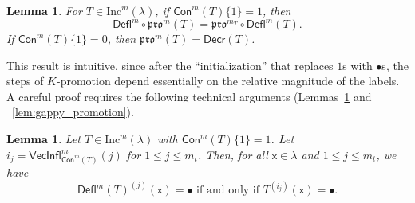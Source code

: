 \documentclass[12pt]{amsart}
\newcommand{\x}{\ensuremath{\mathsf{x}}}
\newtheorem{lemma}[theorem]{Lemma}
\theoremstyle{definition}
\theoremstyle{remark}
\numberwithin{equation}{section}
\newcommand{\inc}{\ensuremath{\mathrm{Inc}}}
\newcommand{\pro}{\mathfrak{pro}}
\newcommand{\decr}{\ensuremath{\mathsf{Decr}}}
\newcommand{\deflate}{\ensuremath{\mathsf{Defl}}}
\newcommand{\inflate}{\ensuremath{\mathsf{VecInfl}}}
\newcommand{\content}{\ensuremath{\mathsf{Con}}}
\begin{document}
\begin{lemma}\label{lem:deflation_commutation}
For $T \in \inc^m(\lambda)$, if $\content^m(T) \lbrace 1 \rbrace = 1$, then
\begin{equation}\label{eq:deflation_commutation}
\deflate^m \circ \pro^m(T) = \pro^{m_T} \circ \deflate^m(T).
\end{equation}
If $\content^m(T) \lbrace 1 \rbrace = 0$, then $\pro^m(T) = \decr(T)$. 
\end{lemma} 
This result is intuitive, since after the ``initialization'' that replaces $1$s with $\bullet$s, the steps of $K$-promotion depend essentially on the relative magnitude of the labels. A careful proof requires the following technical arguments (Lemmas~\ref{lem:bullet_placement} and ~\ref{lem:gappy_promotion}). 
\begin{lemma} \label{lem:bullet_placement}
Let $T \in \inc^m(\lambda)$ with $\content^m(T) \lbrace 1 \rbrace = 1$. Let $i_j = \inflate^m_{\content^m(T)}(j)$ for $1 \leq j \leq m_t$. Then, for all $\x \in \lambda$ and $1 \leq j \leq m_t$, we have
 \begin{equation}\label{eq:gappy_promotion2}
\deflate^m(T)^{(j)}(\x) = \bullet \text{ if and only if } T^{(i_j)}(\x) = \bullet.
\end{equation}
\end{lemma}
\end{document}
